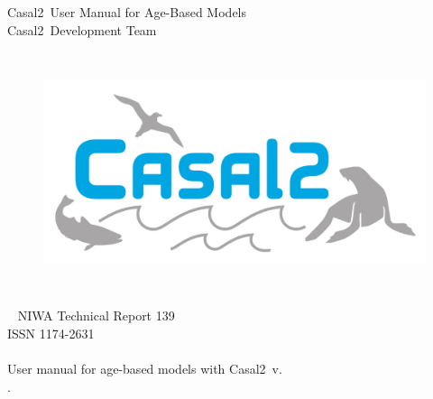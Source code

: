 \documentclass[a4paper,11pt,twoside,pdftex]{article}
\newcommand{\DocYear}{\SourceControlYearDoc}
\newcommand{\VER}{v\Version} %
\newcommand{\CNAME}{Casal2}
\newcommand{\authors}{\CNAME\ Development Team}
\begin{document}
\sloppy %


\begin{titlepage}
  \thispagestyle{empty} %
	\begin{center}

		\vspace*{2.5cm}
		\Huge \CNAME\ User Manual for Age-Based Models\\

		\vspace{2.0cm}
		\huge \authors %

		\vspace{2cm}
		\begin{figure}[htp]
			\begin{center}
			 \includegraphics[height=7cm]{Figures/CASAL2.png}
			\end{center}
		\end{figure}

		~\vfill
		\Large NIWA Technical Report 139 \\%
		\Large ISSN 1174-2631 \\%
		\Large \DocYear \\%

		\vspace{1.0cm}
		User manual for age-based models with \CNAME\ \VER. \\ \SourceRepos.

	\end{center}
\end{titlepage}
\end{document}
